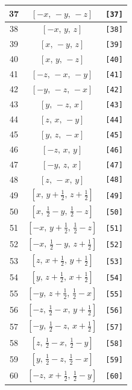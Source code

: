 \documentclass[fleqn,8pt]{jsarticle}
\begin{document}
\begin{longtable}{ccc}
37 & $\left[ - x,\, - y,\, - z \right]$ & {\tt [37]} \\ \hline
38 & $\left[ - x,\, y,\, z \right]$ & {\tt [38]} \\ \hline
39 & $\left[ x,\, - y,\, z \right]$ & {\tt [39]} \\ \hline
40 & $\left[ x,\, y,\, - z \right]$ & {\tt [40]} \\ \hline
41 & $\left[ - z,\, - x,\, - y \right]$ & {\tt [41]} \\ \hline
42 & $\left[ - y,\, - z,\, - x \right]$ & {\tt [42]} \\ \hline
43 & $\left[ y,\, - z,\, x \right]$ & {\tt [43]} \\ \hline
44 & $\left[ z,\, x,\, - y \right]$ & {\tt [44]} \\ \hline
45 & $\left[ y,\, z,\, - x \right]$ & {\tt [45]} \\ \hline
46 & $\left[ - z,\, x,\, y \right]$ & {\tt [46]} \\ \hline
47 & $\left[ - y,\, z,\, x \right]$ & {\tt [47]} \\ \hline
48 & $\left[ z,\, - x,\, y \right]$ & {\tt [48]} \\ \hline
49 & $\left[ x,\, y + \frac{1}{2},\, z + \frac{1}{2} \right]$ & {\tt [49]} \\ \hline
50 & $\left[ x,\, \frac{1}{2} - y,\, \frac{1}{2} - z \right]$ & {\tt [50]} \\ \hline
51 & $\left[ - x,\, y + \frac{1}{2},\, \frac{1}{2} - z \right]$ & {\tt [51]} \\ \hline
52 & $\left[ - x,\, \frac{1}{2} - y,\, z + \frac{1}{2} \right]$ & {\tt [52]} \\ \hline
53 & $\left[ z,\, x + \frac{1}{2},\, y + \frac{1}{2} \right]$ & {\tt [53]} \\ \hline
54 & $\left[ y,\, z + \frac{1}{2},\, x + \frac{1}{2} \right]$ & {\tt [54]} \\ \hline
55 & $\left[ - y,\, z + \frac{1}{2},\, \frac{1}{2} - x \right]$ & {\tt [55]} \\ \hline
56 & $\left[ - z,\, \frac{1}{2} - x,\, y + \frac{1}{2} \right]$ & {\tt [56]} \\ \hline
57 & $\left[ - y,\, \frac{1}{2} - z,\, x + \frac{1}{2} \right]$ & {\tt [57]} \\ \hline
58 & $\left[ z,\, \frac{1}{2} - x,\, \frac{1}{2} - y \right]$ & {\tt [58]} \\ \hline
59 & $\left[ y,\, \frac{1}{2} - z,\, \frac{1}{2} - x \right]$ & {\tt [59]} \\ \hline
60 & $\left[ - z,\, x + \frac{1}{2},\, \frac{1}{2} - y \right]$ & {\tt [60]} \\ \hline

\end{longtable}
\end{document}
